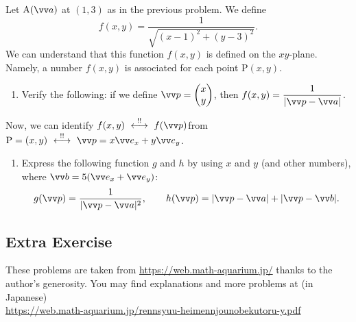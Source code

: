 \documentclass[11pt,pdfa,lastpage]{MishoNote}
\begin{document}
\begin{problems}
\Problem[B] Let $\posvec Aa$ at $(1,3)$ as in the previous problem. We define
\[f(x,y)=\frac{1}{\sqrt{(x-1)^2+(y-3)^2}}.  \]
We can understand that this function $f(x,y)$ is defined on the $xy$-plane. Namely, a number $f(x,y)$ is associated for each point P$(x,y)$.
\begin{enumerate}
  \item Verify the following: if we define $\vc p=\pmat{x\\y}$, then $f(x,y)=\dfrac{1}{|\vc p-\vc a|}$.
\end{enumerate}
 Now, we can identify $f(x,y)\idrel f(\vc p)$\quad from\quad $\mathrm{P}=(x,y)\idrel \vc p=x\vvex+y\vvey$.
 \begin{enumerate}[start=2]
  \item Express the following function $g$ and $h$ by using $x$ and $y$ (and other numbers), where $\vc b=5(\vvex+\vvey)$:
  \[g(\vc p)=\frac{1}{|\vc p-\vc a|^2},\qquad
  h(\vc p)=|\vc p-\vc a|+|\vc p-\vc b|.
  \]
\end{enumerate}
\end{problems}

\newpage
\subsection{Extra Exercise}
These problems are taken from  \url{https://web.math-aquarium.jp/} thanks to the author's generosity. You may find explanations and more problems at (in Japanese)\\
\phantom{extra space} \url{https://web.math-aquarium.jp/rennsyuu-heimennjounobekutoru-y.pdf}

\smallskip

\noindent{}

\bigskip
\end{document}
